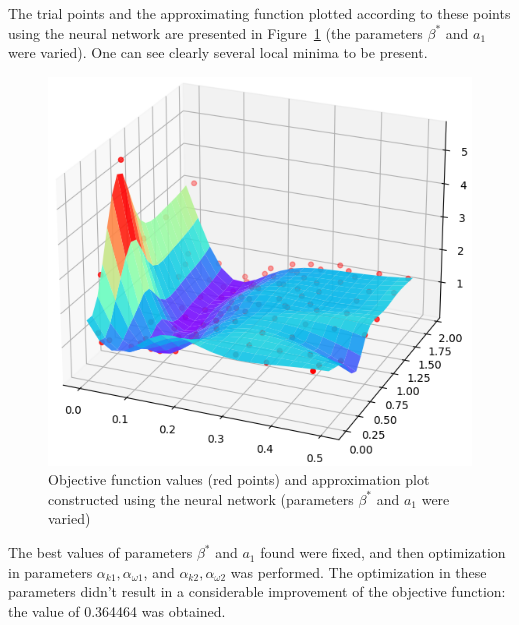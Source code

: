 \documentclass[sensors,article,submit,moreauthors,pdftex]{Definitions/mdpi}
\begin{document}
The trial points and the approximating function plotted according to these points using the neural network are presented in Figure~\ref{NN_100_point} (the parameters $\beta^*$ and $a_1$ were varied). One can see clearly several local minima to be present.

\begin{figure}[H]
\begin{center}
\includegraphics[width=0.8\linewidth]{NN_100_point_.png}
\caption{Objective function values (red points) and approximation plot constructed using the neural network (parameters $\beta^*$ and $a_1$ were varied)}
\label{NN_100_point}
\end{center}
\end{figure}

The best values of parameters $\beta^*$ and $a_1$ found were fixed, and then optimization in parameters $\alpha_{k1}, \alpha_{\omega1}$, and $\alpha_{k2}, \alpha_{\omega2}$ was performed. 
The optimization in these parameters didn't result in a considerable improvement of the objective function: the value of 0.364464 was obtained.


%
%
\end{document}
